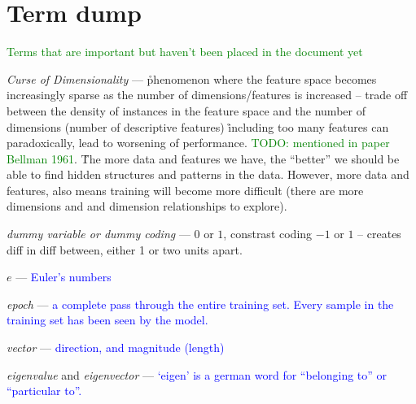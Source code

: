 \chapter{Term dump}

\textcolor{green}{Terms that are important but haven't been placed in the document yet}



\emph{Curse of Dimensionality} --- \r{phenomenon where the feature space becomes increasingly sparse as the number of dimensions/features is increased -- trade off between the density of instances in the feature space and the number of dimensions (number of descriptive features) \r{including too many features can paradoxically, lead to worsening of performance.} \textcolor{green}{TODO: mentioned in paper Bellman 1961}}. \r{The more data and features we have, the ``better'' we should be able to find hidden structures and patterns in the data. However, more data and features, also means training will become more difficult (there are more dimensions and and dimension relationships to explore).}

\emph{dummy variable or dummy coding} --- $0$ or $1$, constrast coding $-1$ or $1$ -- creates diff in diff between, either 1 or two units apart.



\emph{$e$} --- \textcolor{blue}{Euler's numbers}


\emph{epoch} --- \textcolor{blue}{a complete pass through the entire training set. Every sample in the training set has been seen by the model.} 

\emph{vector} --- \textcolor{blue}{direction, and magnitude (length)}

\emph{eigenvalue} and \emph{eigenvector} --- \textcolor{blue}{`eigen' is a german word for ``belonging to'' or ``particular to''.} 




